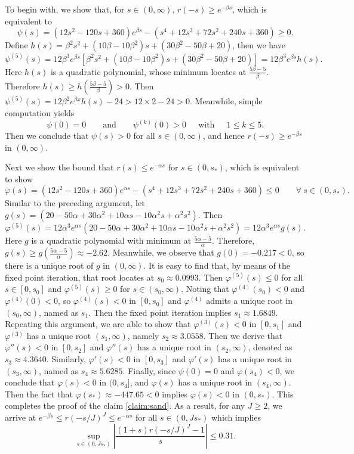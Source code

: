 \documentclass[a4paper, oneside]{book}
\begin{document}
To begin with, we show that, for $s\in(0,\infty)$, $r(-s) \ge e^{-\beta s}$, which is equivalent to
$$\psi(s) = (12s^2-120s+360)e^{\beta s} -(s^4+12s^3+72s^2 + 240s + 360)
 \ge 0.$$
Define $h(s) = \beta^2s^2 + (10\beta-10\beta^2)s+(30\beta^2-50\beta+20)$,
then we have
$$\psi^{(5)}(s) = 12\beta^3e^{\beta s}
\left[\beta^2s^2 + (10\beta-10\beta^2)s+(30\beta^2-50\beta+20)\right]
=12\beta^3e^{\beta s}h(s).$$
Here $h(s)$ is a quadratic polynomial, whose
minimum locates at $\frac{5\beta-5}{\beta}$.
Therefore $h(s) \geq h (\tfrac{5\beta-5}{\beta} ) > 0$.
Then $\psi^{(5)}(s) = 12\beta^2e^{\beta x}h(s)-24 > 12\times 2-24>0$.
Meanwhile, simple computation yields
$$ \psi(0)=0 \qquad \text{and}
\qquad \psi^{(k)}(0)>0~~\quad \text{with}~~ \quad
1\le k\le 5.  $$
Then we conclude that  $\psi(s) > 0$ for all  $s\in (0, \infty)$, and hence
 $r(-s) \ge e^{-\beta s}$ in $(0, \infty)$.

Next we show the bound that $r(s) \le e^{-\alpha s}$ for $s\in (0,s_*)$, which is equivalent to show
$$\varphi(s) = (12s^2-120s+360)e^{\alpha s}
-(s^4+12s^3+72s^2 + 240s + 360) \le 0 \qquad \forall~s\in (0,s_*).$$
Similar to the preceding argument, let $g(s) = (20-50 \alpha + 30 \alpha^2  +10\alpha s -10\alpha^2s +\alpha^2s^2)$. Then
$$  \varphi^{(5)}(s) = 12\alpha^3e^{\alpha s}
(20-50 \alpha + 30 \alpha^2
+10\alpha s -10\alpha^2s +\alpha^2s^2)
= 12\alpha^3e^{\alpha s}  g(s). $$
Here $g$ is a quadratic polynomial with minimum at $\frac{5\alpha-5}{\alpha}$. Therefore, $g(s)\ge g(\tfrac{5\alpha-5}{\alpha}) \approx -2.62$.
Meanwhile, we observe that $g(0) = -0.217 <0$, so
there is a unique root of $g$ in $(0, \infty)$.
It is easy to find that, by means of the fixed point iteration,
that root locates at $s_0\approx0.0993$. Then $\varphi^{(5)}(s) \le 0$
for all $s\in [0,s_0]$ and $\varphi^{(5)}(s) \ge 0$ for $s\in (s_0,\infty)$. Noting that $\varphi^{(4)}(s_0) < 0$ and $\varphi^{(4)}(0) < 0$, so $\varphi^{(4)}(s) < 0$ in $[0,s_0]$ and $\varphi^{(4)}$ admits a unique root in $(s_0,\infty)$, named as $s_1$.
Then the fixed point iteration implies $s_1\approx  1.6849$.
Repeating this argument, we are able to show that
$\varphi^{(3)}(s) < 0$ in $[0,s_1]$ and $\varphi^{(3)}$ has a unique root $(s_1,\infty)$, namely $s_2\approx 3.0558$.
Then we derive that
$\varphi{''}(s) < 0$ in $[0,s_2]$ and  $\varphi{''}(s)$
has a unique root in $(s_2,\infty)$,
denoted as $s_3\approx 4.3640$.
Similarly, $\varphi{'}(s) < 0$ in $[0,s_3]$ and  $\varphi{'}(s)$
has a unique root in $(s_3,\infty)$, named as $s_4\approx 5.6285$.
Finally, since $\psi(0)=0$ and $\varphi(s_4)<0$, we conclude that
$\varphi(s)<0$ in $(0,s_4]$, and $\varphi(s)$ has a unique root in $(s_4,\infty)$. Then the fact that $\varphi(s_*) \approx -447.65<0$ implies $\varphi(s)<0$ in $(0,s_*)$.
This completes the proof of the claim \eqref{claim:sand}.
As a result, for any $J\ge 2$, we arrive at $e^{-\beta s} \le r(-s/J)^J \le e^{-\alpha s}$
for all $s\in(0, J s_*)$ which  implies
\begin{equation*}
    \sup_{s\in(0, J s_*)}
    \left|\frac{(1+s) r(-s/J)^J-1}{s}\right| \le 0.31.
\end{equation*}
\end{document}
